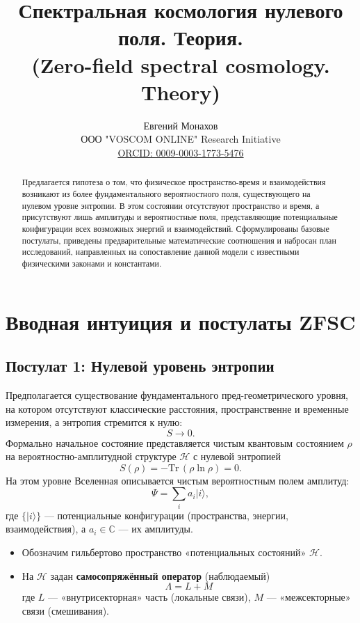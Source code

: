 \documentclass[12pt,a4paper]{article}
\title{Спектральная космология нулевого поля. Теория.\\
(Zero-field spectral cosmology. Theory)}
\author{Евгений Монахов \\ ООО "VOSCOM ONLINE" Research Initiative \\ \href{https://orcid.org/0009-0003-1773-5476}{ORCID: 0009-0003-1773-5476}}
\date{}
\begin{document}
\maketitle

\begin{abstract}
Предлагается гипотеза о том, что физическое пространство-время и взаимодействия возникают из более фундаментального вероятностного поля, существующего на нулевом уровне энтропии. В этом состоянии отсутствуют пространство и время, а присутствуют лишь амплитуды и вероятностные поля, представляющие потенциальные конфигурации всех возможных энергий и взаимодействий. Сформулированы базовые постулаты, приведены предварительные математические соотношения и набросан план исследований, направленных на сопоставление данной модели с известными физическими законами и константами.
\end{abstract}


\section{Вводная интуиция и постулаты ZFSC}


\subsection{Постулат 1: Нулевой уровень энтропии}
Предполагается существование фундаментального пред-геометрического уровня, на котором отсутствуют классические расстояния, пространственне и временные измерения, а энтропия стремится к нулю:
\[
S \to 0.
\]
Формально начальное состояние представляется чистым квантовым состоянием \(\rho\) на вероятностно-амплитудной структуре \(\mathcal H\) с нулевой энтропией
\[
S(\rho)=-\mathrm{Tr}\,(\rho\ln\rho)=0.
\]
На этом уровне Вселенная описывается чистым вероятностным полем амплитуд:
\[
\Psi = \sum_{i} a_i |i\rangle ,
\]
где $\{|i\rangle\}$ — потенциальные конфигурации (пространства, энергии, взаимодействия), а $a_i \in \mathbb{C}$ — их амплитуды.

\begin{itemize}
    \item Обозначим гильбертово пространство «потенциальных состояний» \(\mathcal{H}\).
    \item На \(\mathcal{H}\) задан \textbf{самосопряжённый оператор} (наблюдаемый)  
    \[
    \boxed{\Lambda = L + M} \tag{1}
    \]
    где \(L\) — «внутрисекторная» часть (локальные связи), \(M\) — «межсекторные» связи (смешивания).
\end{itemize}
\end{document}
